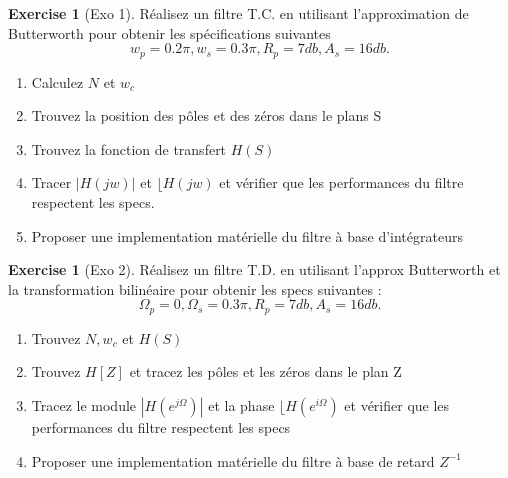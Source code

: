 \documentclass{article}
\theoremstyle{plain}%
\theoremstyle{definition}
\newtheorem{xca}[exmp]{Exercise}
\theoremstyle{remark}
\begin{document}
\begin{xca}[Exo 1]
    Réalisez un filtre T.C. en utilisant l'approximation de Butterworth pour obtenir les spécifications suivantes 
    \[
        w_p = 0.2 \pi, w_s=0.3 \pi , R_p = 7 db, A_s = 16 db
    .\]
    \begin{enumerate}
        \item Calculez $ N $ et $ w_c $
        \item Trouvez la position des pôles et des zéros dans le plans S
        \item Trouvez la fonction de transfert $ H(S) $
        \item Tracer $ \left| H(jw) \right|  $ et $ \lfloor H(jw) $ et vérifier que les performances du filtre respectent les specs.
        \item Proposer une implementation matérielle du filtre à base d'intégrateurs
    \end{enumerate}
\end{xca}

\begin{xca}[Exo 2]
    Réalisez un filtre T.D. en utilisant l'approx Butterworth et la transformation bilinéaire pour obtenir les specs suivantes : 
    \[
        \Omega _p = 0, \Omega _s = 0.3 \pi, R_p = 7db, A_s = 16 db
    .\]
    \begin{enumerate}
        \item Trouvez $ N, w_c $ et $ H(S) $ 
        \item Trouvez $ H[Z] $ et tracez les pôles et les zéros dans le plan Z
        \item Tracez le module $ \left| H(e^{j \Omega }) \right| $ et la phase $ \lfloor H(e^{i \Omega }) $ et vérifier que les performances du filtre respectent les specs
        \item Proposer une implementation matérielle du filtre à base de retard $ Z^{-1} $ 
    \end{enumerate}
\end{xca}
\end{document}
